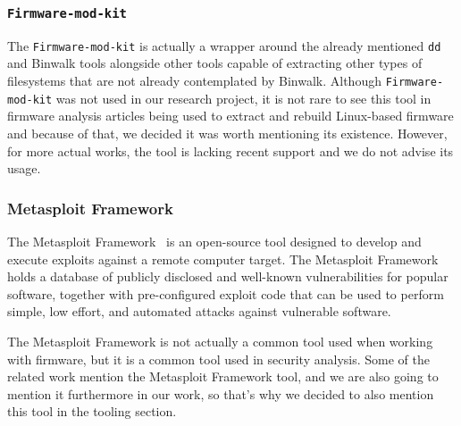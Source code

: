 \subsubsection{ {\tt Firmware-mod-kit} }

The {\tt Firmware-mod-kit} \cite{google-code:firmware-mod-kit} is actually a wrapper around the already mentioned {\tt dd} and Binwalk tools alongside other tools capable of extracting other types of filesystems that are not already contemplated by Binwalk. Although {\tt Firmware-mod-kit} was not used in our research project, it is not rare to see this tool in firmware analysis articles being used to extract and rebuild Linux-based firmware and because of that, we decided it was worth mentioning its existence. However, for more actual works, the tool is lacking recent support and we do not advise its usage.

\subsubsection{Metasploit Framework}

The Metasploit Framework~\cite{github:metasploit} is an open-source tool designed to develop and execute exploits against a remote computer target. The Metasploit Framework holds a database of publicly disclosed and well-known vulnerabilities for popular software, together with pre-configured exploit code that can be used to perform simple, low effort, and automated attacks against vulnerable software.

The Metasploit Framework is not actually a common tool used when working with firmware, but it is a common tool used in security analysis. Some of the related work mention the Metasploit Framework tool, and we are also going to mention it furthermore in our work, so that's why we decided to also mention this tool in the tooling section.